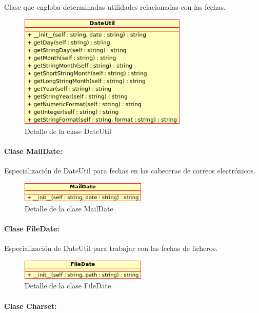 Clase que engloba determinadas utilidades relacionadas con las fechas.

\begin{figure}[H]
	\centering
 	\includegraphics[width=8cm]{images/uml/clases/dateutil-class.png}
	\caption{Detalle de la clase DateUtil}
	\label{fig:uml:dateutil-class}
\end{figure}

\paragraph{Clase MailDate:}

Especialización de DateUtil para fechas en las cabeceras de correos electrónicos.

\begin{figure}[H]
	\centering
 	\includegraphics[width=6cm]{images/uml/clases/maildate-class.png}
	\caption{Detalle de la clase MailDate}
	\label{fig:uml:maildate-class}
\end{figure}

\paragraph{Clase FileDate:}

Especialización de DateUtil para trabajar con las fechas de ficheros.

\begin{figure}[H]
	\centering
 	\includegraphics[width=6cm]{images/uml/clases/filedate-class.png}
	\caption{Detalle de la clase FileDate}
	\label{fig:uml:filedate-class}
\end{figure}

\paragraph{Clase Charset:}

